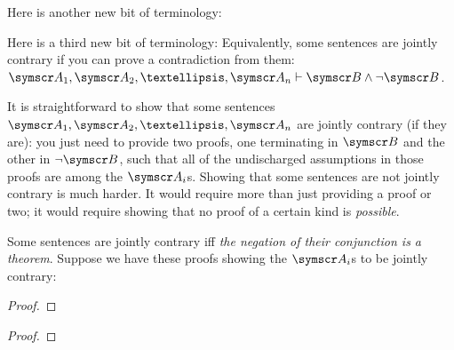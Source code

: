 Here is another new bit of terminology:

Here is a third new bit of terminology:
	 Equivalently, some sentences are jointly contrary if you can prove a contradiction from them: $\meta{A}_{1},\meta{A}_{2},…, \meta{A}_{n} \proves \meta{B}\eand\enot\meta{B}$. 

It is straightforward to show that some sentences $\meta{A}_{1},\meta{A}_{2},…, \meta{A}_{n}$ are jointly contrary (if they are): you just need to provide two proofs, one terminating in $\meta{B}$ and the other in $\enot\meta{B}$, such that all of the undischarged assumptions in those proofs are among the $\meta{A}_{i}$s. Showing that some sentences are not jointly contrary is much harder. It would require more than just providing a proof or two; it would require showing that no proof of a certain kind is \emph{possible}.


Some sentences are jointly contrary iff \emph{the negation of their conjunction is a theorem}. Suppose we have these proofs showing the $\meta{A}_{i}$s to be jointly contrary: 

\begin{multicols}{2}\noindent
	\begin{proof}
		\hypo[\ ]{}{\vdots}
		\have[\ ]{}{\vdots}
	\end{proof}

	\begin{proof}
		\hypo[\ ]{}{\vdots}
		\have[\ ]{}{\vdots}
	\end{proof}
\end{multicols}

